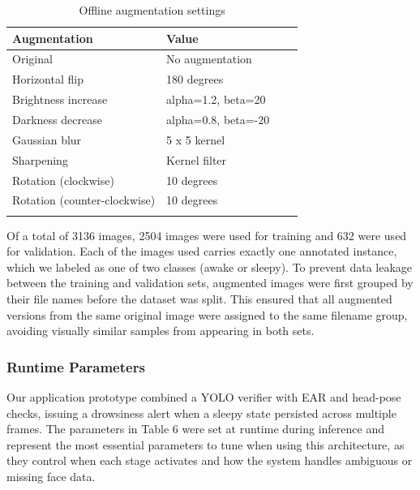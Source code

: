 \documentclass[pdflatex,sn-mathphys-num]{sn-jnl}
\theoremstyle{thmstyleone}%
\theoremstyle{thmstyletwo}%
\theoremstyle{thmstylethree}%
\begin{document}
	\begin{table}[h]
		\caption{Offline augmentation settings}\label{offline_augmentation_settings}%
		\begin{tabular}{@{}llll@{}}
			\toprule
			Augmentation & Value  \\
			\midrule
			Original    & No augmentation  \\
			Horizontal flip    & 180 degrees  \\
			Brightness increase    & alpha=1.2, beta=20  \\
			Darkness decrease    & alpha=0.8, beta=-20 \\
			Gaussian blur    & 5 x 5 kernel  \\
			Sharpening    & Kernel filter  \\
			Rotation (clockwise)    & 10 degrees  \\
			Rotation (counter-clockwise)    & 10 degrees  \\
			\botrule
		\end{tabular}
	\end{table}
	
	Of a total of 3136 images, 2504 images were used for training and 632 were used for validation. Each of the images used carries exactly one annotated instance, which we labeled as one of two classes (awake or sleepy). To prevent data leakage between the training and validation sets, augmented images were first grouped by their file names before the dataset was split. This ensured that all augmented versions from the same original image were assigned to the same filename group, avoiding visually similar samples from appearing in both sets.
	
	\subsubsection{Runtime Parameters}\label{subsec:runtime}
	Our application prototype combined a YOLO verifier with EAR and head-pose checks, issuing a drowsiness alert when a sleepy state persisted across multiple frames. The parameters in Table 6 were set at runtime during inference and represent the most essential parameters to tune when using this architecture, as they control when each stage activates and how the system handles ambiguous or missing face data.
	
\end{document}
